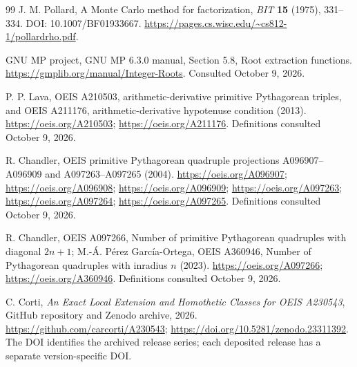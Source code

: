 \documentclass[11pt]{article}
\theoremstyle{definition}
\begin{document}
\begin{thebibliography}{99}
J. M. Pollard, A Monte Carlo method for factorization,
\emph{BIT} \textbf{15} (1975), 331--334.
DOI: 10.1007/BF01933667.
\url{https://pages.cs.wisc.edu/~cs812-1/pollardrho.pdf}.

GNU MP project, GNU MP 6.3.0 manual, Section 5.8, Root extraction functions.
\url{https://gmplib.org/manual/Integer-Roots}. Consulted October 9, 2026.

P. P. Lava, OEIS A210503, arithmetic-derivative primitive Pythagorean
triples, and OEIS A211176, arithmetic-derivative hypotenuse condition
(2013). \url{https://oeis.org/A210503}; \url{https://oeis.org/A211176}.
Definitions consulted October 9, 2026.

R. Chandler, OEIS primitive Pythagorean quadruple projections
A096907--A096909 and A097263--A097265 (2004).
\url{https://oeis.org/A096907}; \url{https://oeis.org/A096908};
\url{https://oeis.org/A096909}; \url{https://oeis.org/A097263};
\url{https://oeis.org/A097264}; \url{https://oeis.org/A097265}.
Definitions consulted October 9, 2026.

R. Chandler, OEIS A097266, Number of primitive Pythagorean quadruples
with diagonal $2n+1$;
M.-\'{A}. P\'{e}rez Garc\'{i}a-Ortega, OEIS A360946,
Number of Pythagorean quadruples with inradius $n$ (2023).
\url{https://oeis.org/A097266}; \url{https://oeis.org/A360946}.
Definitions consulted October 9, 2026.

C. Corti, \emph{An Exact Local Extension and Homothetic Classes for
OEIS A230543}, GitHub repository and Zenodo archive, 2026.
\url{https://github.com/carcorti/A230543};
\url{https://doi.org/10.5281/zenodo.23311392}.
The DOI identifies the archived release series; each deposited release has
a separate version-specific DOI.
\end{thebibliography}
\endgroup
\end{document}
